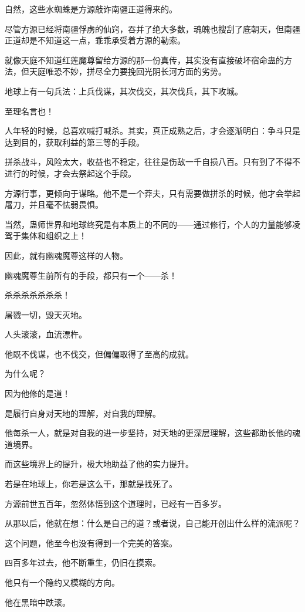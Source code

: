 \begin{this_body}
自然，这些水蜘蛛是方源敲诈南疆正道得来的。

尽管方源已经将南疆俘虏的仙窍，吞并了绝大多数，魂魄也搜刮了底朝天，但南疆正道却是不知道这一点，乖乖承受着方源的勒索。

就像天庭不知道红莲魔尊留给方源的那一份真传，其实没有直接破坏宿命蛊的方法，但天庭唯恐不妙，拼尽全力要挽回光阴长河方面的劣势。

地球上有一句兵法：上兵伐谋，其次伐交，其次伐兵，其下攻城。

至理名言也！

人年轻的时候，总喜欢喊打喊杀。其实，真正成熟之后，才会逐渐明白：争斗只是达到目的，获取利益的第三等的手段。

拼杀战斗，风险太大，收益也不稳定，往往是伤敌一千自损八百。只有到了不得不进行的时候，才会去祭起这个手段。

方源行事，更倾向于谋略。他不是一个莽夫，只有需要做拼杀的时候，他才会举起屠刀，并且毫不怯弱畏惧。

当然，蛊师世界和地球终究是有本质上的不同的——通过修行，个人的力量能够凌驾于集体和组织之上！

因此，就有幽魂魔尊这样的人物。

幽魂魔尊生前所有的手段，都只有一个——杀！

杀杀杀杀杀杀杀！

屠戮一切，毁天灭地。

人头滚滚，血流漂杵。

他既不伐谋，也不伐交，但偏偏取得了至高的成就。

为什么呢？

因为他修的是道！

是履行自身对天地的理解，对自我的理解。

他每杀一人，就是对自我的进一步坚持，对天地的更深层理解，这些都助长他的魂道境界。

而这些境界上的提升，极大地助益了他的实力提升。

若是在地球上，你若是这么干，那就是找死了。

方源前世五百年，忽然体悟到这个道理时，已经有一百多岁。

从那以后，他就在想：什么是自己的道？或者说，自己能开创出什么样的流派呢？

这个问题，他至今也没有得到一个完美的答案。

四百多年过去，他不断重生，仍旧在摸索。

他只有一个隐约又模糊的方向。

他在黑暗中跌滚。


\end{this_body}
